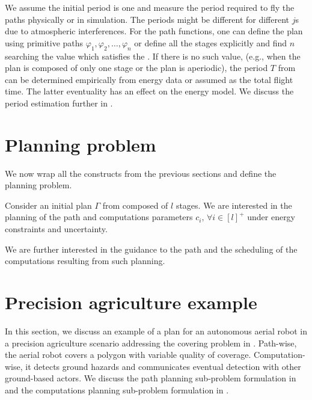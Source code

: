 We assume the initial period is one and measure the period required to fly the paths physically or in simulation. The periods might be different for different $j$s due to atmospheric interferences. For the path functions, one can define the plan using primitive paths $\varphi_1,\varphi_2,\dots,\varphi_n$ or define all the stages explicitly and find $n$ searching the value which satisfies the . If there is no such value, (e.g., when the plan is composed of only one stage or the plan is aperiodic), the period $T$ from  can be determined empirically from energy data or assumed as the total flight time. The latter eventuality has an effect on the energy model. We discuss the period estimation further in .

\section{Planning problem}
\label{sec:plan-pb}

We now wrap all the constructs from the previous sections and define the planning problem.

\begin{highlight}
\begin{pb}\label{pb}
  Consider an initial plan $\Gamma$ from  composed of $l$ stages. We are interested in the planning of the path and computations parameters $c_i,\,\forall i\in[l]^+$ under energy constraints and uncertainty.
  
  We are further interested in the guidance to the path and the scheduling of the computations resulting from such planning.
\end{pb}    
\end{highlight}


\section{Precision agriculture example}
\label{sec:flight-plan}

In this section, we discuss an example of a plan for an autonomous aerial robot in a precision agriculture scenario addressing the covering problem in . Path-wise, the aerial robot covers a polygon with variable quality of coverage. Computation-wise, it detects ground hazards and communicates eventual detection with other ground-based actors. We discuss the path planning sub-problem formulation in  and the computations planning sub-problem formulation in .

